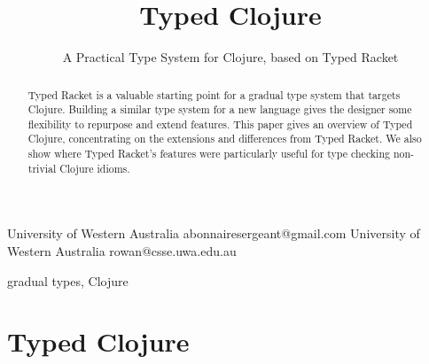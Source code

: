 \documentclass[preprint,10pt]{sigplanconf}
\begin{document}
\setlength{\pdfpageheight}{\paperheight}
\setlength{\pdfpagewidth}{\paperwidth}






\title{Typed Clojure}
\subtitle{A Practical Type System for Clojure, based on Typed Racket}

           {University of Western Australia}
           {abonnairesergeant@gmail.com}
           {University of Western Australia}
           {rowan@csse.uwa.edu.au}

\maketitle

\begin{abstract}
Typed Racket is a valuable starting point for
a gradual type system that targets Clojure.
Building a similar type system for a new language gives the
designer some flexibility to repurpose and extend features.
This paper gives an overview of Typed Clojure, concentrating
on the extensions and differences from Typed Racket. We also
show where Typed Racket's features were particularly useful
for type checking non-trivial Clojure idioms.
\end{abstract}



\keywords
gradual types, Clojure

\section{Typed Clojure}
\end{document}
